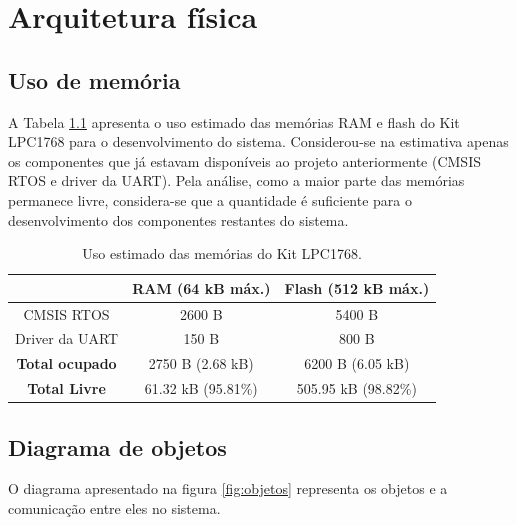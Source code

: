 \chapter{Arquitetura física}

\section{Uso de memória}

A Tabela \ref{tab:uso_memoria} apresenta o uso estimado das memórias RAM e flash do Kit LPC1768 para o desenvolvimento do sistema. Considerou-se na estimativa apenas os componentes que já estavam disponíveis ao projeto anteriormente (CMSIS RTOS e driver da UART). Pela análise, como a maior parte das memórias permanece livre, considera-se que a quantidade é suficiente para o desenvolvimento dos componentes restantes do sistema.

\begin{table}[h!]
	\caption{Uso estimado das memórias do Kit LPC1768.}
	\centering
	\begin{tabular}{|c|c|c|}
		\hline
		\textbf{} &\textbf{RAM (64 kB máx.)} & \textbf{Flash (512 kB máx.)} \\ \hline \hline
		CMSIS RTOS & 2600 B & 5400 B\\
		Driver da UART & 150 B & 800 B\\
		\hline
		\bf{Total ocupado} & 2750 B (2.68 kB) & 6200 B (6.05 kB)\\
		\bf{Total Livre} & 61.32 kB (95.81\%) & 505.95 kB (98.82\%) \\
		\hline
	\end{tabular}
	\label{tab:uso_memoria}
\end{table}


\section{Diagrama de objetos}

O diagrama apresentado na figura \ref{fig:objetos} representa os objetos e a comunicação entre eles no sistema.

